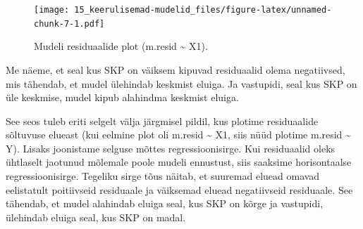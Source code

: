 \documentclass[]{book}
\newenvironment{Shaded}{\begin{snugshade}}{\end{snugshade}}
\newcommand{\CommentTok}[1]{\textcolor[rgb]{0.56,0.35,0.01}{\textit{#1}}}
\newcommand{\DataTypeTok}[1]{\textcolor[rgb]{0.13,0.29,0.53}{#1}}
\newcommand{\DecValTok}[1]{\textcolor[rgb]{0.00,0.00,0.81}{#1}}
\newcommand{\FloatTok}[1]{\textcolor[rgb]{0.00,0.00,0.81}{#1}}
\newcommand{\KeywordTok}[1]{\textcolor[rgb]{0.13,0.29,0.53}{\textbf{#1}}}
\newcommand{\NormalTok}[1]{#1}
\newcommand{\OperatorTok}[1]{\textcolor[rgb]{0.81,0.36,0.00}{\textbf{#1}}}
\newcommand{\StringTok}[1]{\textcolor[rgb]{0.31,0.60,0.02}{#1}}
\begin{document}
\begin{Shaded}
\end{Shaded}

\begin{figure}
\centering
\texttt{[image: 15\_keerulisemad-mudelid\_files/figure-latex/unnamed-chunk-7-1.pdf]}
\caption{\label{fig:unnamed-chunk-7}Mudeli residuaalide plot (m.resid \textasciitilde{} X1).}
\end{figure}

Me näeme, et seal kus SKP on väiksem kipuvad residuaalid olema negatiivsed, mis tähendab, et mudel ülehindab keskmist eluiga. Ja vastupidi, seal kus SKP on üle keskmise, mudel kipub alahindma keskmist eluiga.

See seos tuleb eriti selgelt välja järgmisel pildil, kus plotime residuaalide sõltuvuse elueast (kui eelmine plot oli m.resid \textasciitilde{} X1, siis nüüd plotime m.resid \textasciitilde{} Y). Lisaks joonistame selguse mõttes regressioonisirge. Kui residuaalid oleks ühtlaselt jaotunud mõlemale poole mudeli ennustust, siis saaksime horisontaalse regressioonisirge. Tegeliku sirge tõus näitab, et suuremad eluead omavad eelistatult poitiivseid residuaale ja väiksemad eluead negatiivseid residuaale. See tähendab, et mudel alahindab eluiga seal, kus SKP on kõrge ja vastupidi, ülehindab eluiga seal, kus SKP on madal.
\end{document}
